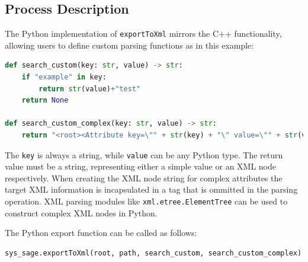 \subsection{Process Description}

The Python implementation of \verb|exportToXml| mirrors the C++ functionality, allowing users to define custom parsing functions as in this example:

\begin{lstlisting}[language=Python, xleftmargin=4em, frame = single]
def search_custom(key: str, value) -> str:
    if "example" in key:
        return str(value)+"test"
    return None

def search_custom_complex(key: str, value) -> str:
    return "<root><Attribute key=\"" + str(key) + "\" value=\"" + str(value) + "\"/><root>"
\end{lstlisting}

The \verb|key| is always a string, while \verb|value| can be any Python type. The return value must be a string, representing either a simple value or an XML node respectively. When creating the XML node string for complex attributes the target XML information is incapsulated in a tag that is ommitted in the parsing operation. XML parsing modules like \verb|xml.etree.ElementTree|\cite{xml-etree} can be used to construct complex XML nodes in Python.

The Python export function can be called as follows:

\begin{lstlisting}[language=Python, xleftmargin=4em, frame = single]
sys_sage.exportToXml(root, path, search_custom, search_custom_complex)
\end{lstlisting}



